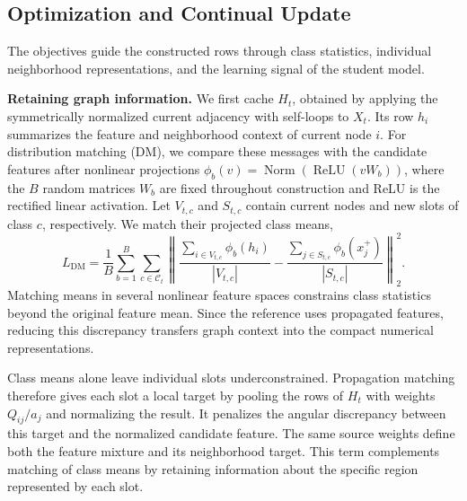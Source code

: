 \subsection{Optimization and Continual Update}
\label{sec:method_objectives}
\label{sec:method_update}

The objectives guide the constructed rows through class
statistics, individual neighborhood representations, and the learning
signal of the student model.

\textbf{Retaining graph information.}
We first cache $H_t$, obtained by applying the symmetrically normalized
current adjacency with self-loops to $X_t$. Its row $h_i$ summarizes
the feature and neighborhood context of current node $i$.
For distribution matching (DM), we compare these messages with the candidate
features after nonlinear projections
$\phi_b(v)=\operatorname{Norm}(\operatorname{ReLU}(vW_b))$, where the
$B$ random matrices $W_b$ are fixed throughout construction and ReLU is the
rectified linear activation. Let $V_{t,c}$
and $S_{t,c}$ contain current nodes and new slots of class $c$,
respectively. We match their projected class means,
\begin{equation}
 L_{\mathrm{DM}}=\frac{1}{B}\sum_{b=1}^{B}\sum_{c\in\mathcal C_t}
 \left\|
 \frac{\sum_{i\in V_{t,c}}\phi_b(h_i)}{|V_{t,c}|}
 -\frac{\sum_{j\in S_{t,c}}\phi_b(x_j^+)}{|S_{t,c}|}
 \right\|_2^2 .
\label{eq:method_dm}
\end{equation}
Matching means in several nonlinear feature spaces constrains class
statistics beyond the original feature mean. Since the reference uses
propagated features, reducing this discrepancy transfers graph context
into the compact numerical representations.

Class means alone leave individual slots underconstrained. Propagation
matching therefore gives each slot a local target by pooling the rows of
$H_t$ with weights $Q_{ij}/a_j$ and normalizing the result. It penalizes
the angular discrepancy between this target and the normalized candidate
feature. The same source weights define both the feature mixture and its
neighborhood target. This term complements matching of class means by
retaining information about the
specific region represented by each slot.

